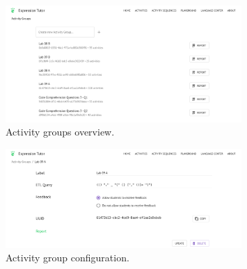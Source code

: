 \begin{chapterBody}
\begin{figure}[ht]
    \centering
    \includegraphics[width=0.8\textwidth]{res/6/ag_list.png}
    \caption{Activity groups overview.}
    \label{fig:impl-ag-list}
\end{figure}

\begin{figure}[ht]
    \centering
    \includegraphics[width=0.8\textwidth]{res/6/ag_details.png}
    \caption{Activity group configuration.}
    \label{fig:impl-ag-details}
\end{figure}

\end{chapterBody}